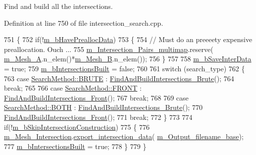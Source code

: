 Find and build all the intersections. 



Definition at line 750 of file intersection\+\_\+search.\+cpp.


\begin{DoxyCode}
751     \{
752         \textcolor{keywordflow}{if}(!\hyperlink{classcarl_1_1_intersection___search_ac3eae683cb64b5bd8b7c0430d6e7496f}{m\_bHavePreallocData})
753         \{
754             \textcolor{comment}{// Must do an preeeety expensive preallocation. Ouch ...}
755             \hyperlink{classcarl_1_1_intersection___search_a21bb47bfa3021d18b718919ad4a245d7}{m\_Intersection\_Pairs\_multimap}.reserve(
      \hyperlink{classcarl_1_1_intersection___search_a903b7b3a369ed2c1e80d6a20ba41d350}{m\_Mesh\_A}.n\_elem()*\hyperlink{classcarl_1_1_intersection___search_a178cd617f59285fb858fddd78dec79d6}{m\_Mesh\_B}.n\_elem());
756         \}
757 
758         \hyperlink{classcarl_1_1_intersection___search_a8f20721814d9dcfab34a0b6c85b88f3c}{m\_bSaveInterData} = \textcolor{keyword}{true};
759         \hyperlink{classcarl_1_1_intersection___search_aff13141f4d631c406fb12b78950f0e1e}{m\_bIntersectionsBuilt} = \textcolor{keyword}{false};
760 
761         \textcolor{keywordflow}{switch} (search\_type)
762         \{
763             \textcolor{keywordflow}{case} \hyperlink{namespacecarl_a2c9d0282cb533624e034ccc1d7b629c7a795a195e14566a465c90e47e4f389447}{SearchMethod::BRUTE} :   
      \hyperlink{classcarl_1_1_intersection___search_a93a7dab3db1129a770d8a7b28322f9aa}{FindAndBuildIntersections\_Brute}();
764                             \textcolor{keywordflow}{break};
765 
766             \textcolor{keywordflow}{case} \hyperlink{namespacecarl_a2c9d0282cb533624e034ccc1d7b629c7af5458c8a9b1cd8aa10c970b4d4853bbb}{SearchMethod::FRONT} :   
      \hyperlink{classcarl_1_1_intersection___search_ad6fd579f71c4e9bebea6bc07d4de8dd5}{FindAndBuildIntersections\_Front}();
767                             \textcolor{keywordflow}{break};
768 
769             \textcolor{keywordflow}{case} \hyperlink{namespacecarl_a2c9d0282cb533624e034ccc1d7b629c7a627ddde9718f452847bda05968663a7c}{SearchMethod::BOTH} :     
      \hyperlink{classcarl_1_1_intersection___search_a93a7dab3db1129a770d8a7b28322f9aa}{FindAndBuildIntersections\_Brute}();
770                             \hyperlink{classcarl_1_1_intersection___search_ad6fd579f71c4e9bebea6bc07d4de8dd5}{FindAndBuildIntersections\_Front}();
771                             \textcolor{keywordflow}{break};
772         \}
773 
774         \textcolor{keywordflow}{if}(!\hyperlink{classcarl_1_1_intersection___search_aef626956ac007f4c737aba3f2f69f2de}{m\_bSkipIntersectionConstruction})
775         \{
776             \hyperlink{classcarl_1_1_intersection___search_a4946b764d66e3f26f323c5d043551c66}{m\_Mesh\_Intersection}.\hyperlink{classcarl_1_1_mesh___intersection_a40d4cca8c4ec73a2576322db063bbefb}{export\_intersection\_data}(
      \hyperlink{classcarl_1_1_intersection___search_a5f8d2ac04fc72c209ec92958552e41f5}{m\_Output\_filename\_base});
777             \hyperlink{classcarl_1_1_intersection___search_aff13141f4d631c406fb12b78950f0e1e}{m\_bIntersectionsBuilt} = \textcolor{keyword}{true};
778         \}
779     \}
\end{DoxyCode}
